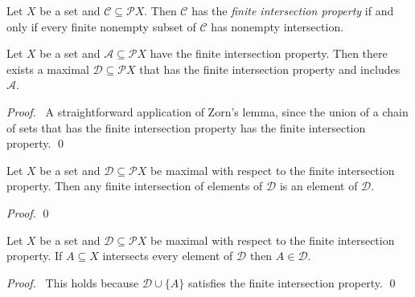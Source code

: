 \begin{df}
  Let $X$ be a set and $\mathcal{C} \subseteq \mathcal{P} X$. Then
  $\mathcal{C}$ has the \emph{finite intersection property} if and only if
  every finite nonempty subset of $\mathcal{C}$ has nonempty intersection.
\end{df}

\begin{lm}[AC]
  \label{lm:sets:finite_intersection_property:maximal}
  Let $X$ be a set and $\mathcal{A} \subseteq \mathcal{P} X$ have the finite intersection property. Then there exists
  a maximal $\mathcal{D} \subseteq \mathcal{P} X$ that has the finite intersection property and includes $\mathcal{A}$.
\end{lm}

\begin{proof}
  \pf\ A straightforward application of Zorn's lemma, since the union of a chain of sets that has the finite intersection property has the finite intersection property. \qed
\end{proof}

\begin{lm}
  \label{lm:sets:finite_intersection_property:finite_intersection}
  Let $X$ be a set and $\mathcal{D} \subseteq \mathcal{P} X$ be maximal with respect to the finite intersection property. Then any finite intersection of elements of $\mathcal{D}$ is an element of $\mathcal{D}$.
\end{lm}

\begin{proof}
  \pf
  \qed
\end{proof}

\begin{lm}
  \label{lm:sets:finite_intersection_property:intersect_all}
  Let $X$ be a set and $\mathcal{D} \subseteq \mathcal{P} X$ be maximal with respect to the finite intersection property. If $A \subseteq X$ intersects every element of $\mathcal{D}$ then $A \in \mathcal{D}$.
\end{lm}

\begin{proof}
  \pf\ This holds because $\mathcal{D} \cup \{ A \}$ satisfies the finite intersection property. \qed
\end{proof}

